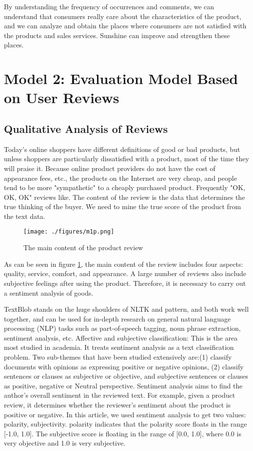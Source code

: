\documentclass{mcmthesis}
\newcommand{\upcite}[1]{\textsuperscript{\textsuperscript{\cite{#1}}}}
\begin{document}
By understanding the frequency of occurrences and comments, we can understand that consumers really care about the characteristics of the product, and we can analyze and obtain the places where consumers are not satisfied with the products and sales services. Sunshine can improve and strengthen these places.

\section{Model 2: Evaluation Model Based on User Reviews}

\subsection{Qualitative Analysis of Reviews}

Today's online shoppers have different definitions of good or bad products, but unless shoppers are particularly dissatisfied with a product, most of the time they will praise it. Because online product providers do not have the cost of appearance fees, etc., the products on the Internet are very cheap, and people tend to be more "sympathetic" to a cheaply purchased product. Frequently "OK, OK, OK" reviews like\upcite{zz}. The content of the review is the data that determines the true thinking of the buyer. We need to mine the true score of the product from the text data.

\begin{figure}[h]
\centering
\texttt{[image: ./figures/m1p.png]}
\caption{The main content of the product review} \label{m1p}
\end{figure}

As can be seen in figure \ref{m1p}, the main content of the review includes four aspects: quality, service, comfort, and appearance. A large number of reviews also include subjective feelings after using the product. Therefore, it is necessary to carry out a sentiment analysis of goods.

TextBlob stands on the huge shoulders of NLTK and pattern, and both work well together, and can be used for in-depth research on general natural language processing (NLP) tasks such as part-of-speech tagging, noun phrase extraction, sentiment analysis, etc\upcite{Martinc2015Efficient}.
Affective and subjective classification: This is the area most studied in academia. It treats sentiment analysis as a text classification problem. Two sub-themes that have been studied extensively are:(1) classify documents with opinions as expressing positive or negative opinions, (2) classify sentences or clauses as subjective or objective, and subjective sentences or clauses as positive, negative or Neutral perspective. Sentiment analysis aims to find the author's overall sentiment in the reviewed text. For example, given a product review, it determines whether the reviewer's sentiment about the product is positive or negative. In this article, we used sentiment analysis to get two values: polarity, subjectivity. polarity indicates that the polarity score floats in the range [-1.0, 1.0]. The subjective score is floating in the range of [0.0, 1.0], where 0.0 is very objective and 1.0 is very subjective.
\end{document}
